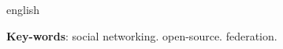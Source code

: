 \begin{resumo}[Abstract]
  \begin{otherlanguage*}{english}
   

  \vspace{\onelineskip}
 
  \noindent 
  \textbf{Key-words}: social networking. open-source. federation.
  \end{otherlanguage*}
\end{resumo}


